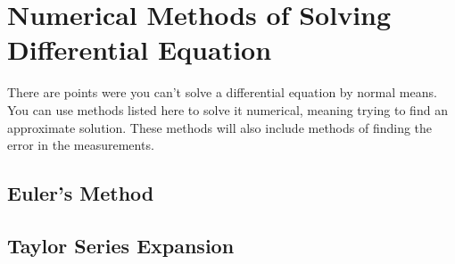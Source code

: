 \chapter{Numerical Methods of Solving Differential Equation}
There are points were you can't solve a differential equation by normal means. You can use methods listed here to solve it numerical, meaning trying to find an approximate solution. These methods will also include methods of finding the error in the measurements. 

\section{Euler's Method}
\section{Taylor Series Expansion}